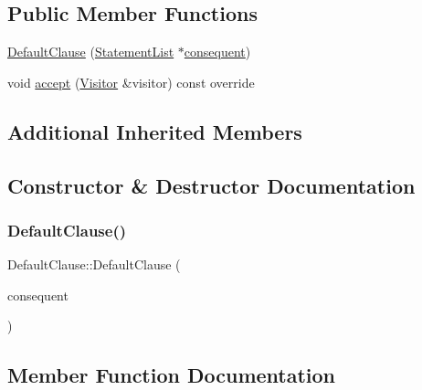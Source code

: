 \subsection*{Public Member Functions}
\begin{DoxyCompactItemize}
\item 
\hyperlink{struct_default_clause_a9f15e6fc45dc6e8a3d87a02aa4798b25}{Default\+Clause} (\hyperlink{struct_statement_list}{Statement\+List} $\ast$\hyperlink{struct_case_clause_a3e6914411610d1893b61172521e11288}{consequent})
\item 
void \hyperlink{struct_default_clause_ade62e79cf9ad891d974528e1e172e2b6}{accept} (\hyperlink{struct_visitor}{Visitor} \&visitor) const override
\end{DoxyCompactItemize}
\subsection*{Additional Inherited Members}


\subsection{Constructor \& Destructor Documentation}
\mbox{\label{struct_default_clause_a9f15e6fc45dc6e8a3d87a02aa4798b25}} 
\subsubsection{\texorpdfstring{Default\+Clause()}{DefaultClause()}}
{\footnotesize\ttfamily Default\+Clause\+::\+Default\+Clause (\begin{DoxyParamCaption}\item[{\hyperlink{struct_statement_list}{Statement\+List} $\ast$}]{consequent }\end{DoxyParamCaption})\hspace{0.3cm}{\ttfamily [inline]}}



\subsection{Member Function Documentation}
\mbox{\label{struct_default_clause_ade62e79cf9ad891d974528e1e172e2b6}} 
